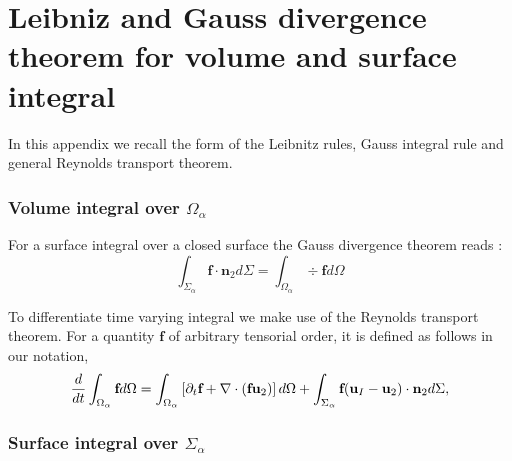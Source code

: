 \section{Leibniz and Gauss divergence theorem for volume and surface integral}
\label{ap:math}

In this appendix we recall the form of the Leibnitz rules, Gauss integral rule and general Reynolds transport theorem. 
\subsubsection*{Volume integral over $\Omega_\alpha$}
For a surface integral over a closed surface the Gauss divergence theorem reads : 
\begin{equation}
    \int_{\Sigma_\alpha} \textbf{f} \cdot \textbf{n}_2 d\Sigma
    = \int_{\Omega_\alpha} \div \textbf{f}d\Omega
\end{equation}

To differentiate time varying integral we make use of the Reynolds transport theorem.
For a quantity $\textbf{f}$ of arbitrary tensorial order, it is defined  as follows in our notation, 
\begin{equation}
    \frac{d}{d t} \int_{\Omega_\alpha} \textbf{f} d\Omega
    = \int_{\Omega_\alpha}\left[\partial_t \textbf{f} + \mathbf{\nabla}\cdot\left(\textbf{f}\textbf{u}_2\right) \right]d\Omega\\
    + \int_{\Sigma_\alpha} \textbf{f} (\textbf{u}_I-\textbf{u}_2)\cdot \textbf{n}_2 d\Sigma,
    \label{eq:Reynolds}
\end{equation}


\subsubsection*{Surface integral over $\Sigma_\alpha$}

